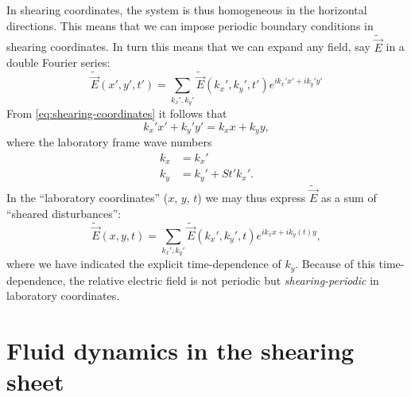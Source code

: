 \documentclass[aps,pre,notitlepage,amsmath,amssymb,amsfonts,nobibnotes,nofootinbib,superscriptaddress,onecolumn,a4paper,10pt]{revtex4-1}
\newcommand{\tvec}[1]{\tilde{\vec{#1}}}
\begin{document}
In shearing coordinates, the system is thus homogeneous in the horizontal
directions. This means that we can impose periodic boundary conditions in
shearing coordinates. In turn this means that we can expand any field, say
$\tvec{E}$ in a double Fourier series:
\begin{equation}
  \tvec{E}(x',y',t') = \sum_{k_x',k_y'}\tvec{E}(k_x',k_y',t')
  e^{ik_x' x' + ik_y' y'}
\end{equation}
From \cref{eq:shearing-coordinates} it follows that
\begin{equation}
  k_x' x' + k_y' y' = k_x x + k_y y,
\end{equation}
where the laboratory frame wave numbers
\begin{align}
  k_x &= k_x' \\
  k_y &= k_y' + St' k_x'.
\end{align}
In the ``laboratory coordinates'' ($x$, $y$, $t$) we may thus express
$\tvec{E}$ as a sum of ``sheared disturbances'':
\begin{equation}
  \tvec{E}(x,y,t) = \sum_{k_x',k_y'}\tvec{E}(k_x',k_y',t)
  e^{ik_x x + ik_y(t) y},
\end{equation}
where we have indicated the explicit time-dependence of $k_y$. Because of this
time-dependence, the relative electric field is not periodic but
\emph{shearing-periodic} in laboratory coordinates.

\section{Fluid dynamics in the shearing sheet}
\end{document}
